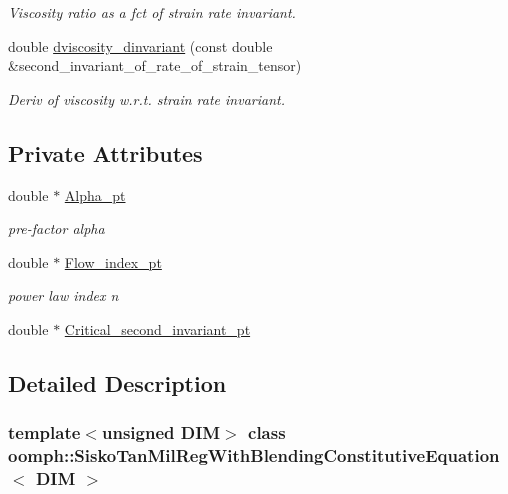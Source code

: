 \begin{DoxyCompactItemize}
\begin{DoxyCompactList}\small\item\em Viscosity ratio as a fct of strain rate invariant. \end{DoxyCompactList}\item 
double \hyperlink{classoomph_1_1SiskoTanMilRegWithBlendingConstitutiveEquation_a66579b2c9c19b7ca3168fe58202e8591}{dviscosity\+\_\+dinvariant} (const double \&second\+\_\+invariant\+\_\+of\+\_\+rate\+\_\+of\+\_\+strain\+\_\+tensor)
\begin{DoxyCompactList}\small\item\em Deriv of viscosity w.\+r.\+t. strain rate invariant. \end{DoxyCompactList}\end{DoxyCompactItemize}
\subsection*{Private Attributes}
\begin{DoxyCompactItemize}
\item 
double $\ast$ \hyperlink{classoomph_1_1SiskoTanMilRegWithBlendingConstitutiveEquation_a33df82ccf7720d8e9bee3be5e4cf4781}{Alpha\+\_\+pt}
\begin{DoxyCompactList}\small\item\em pre-\/factor alpha \end{DoxyCompactList}\item 
double $\ast$ \hyperlink{classoomph_1_1SiskoTanMilRegWithBlendingConstitutiveEquation_a14da5ea532c1e43195a1088ef82a7f22}{Flow\+\_\+index\+\_\+pt}
\begin{DoxyCompactList}\small\item\em power law index n \end{DoxyCompactList}\item 
double $\ast$ \hyperlink{classoomph_1_1SiskoTanMilRegWithBlendingConstitutiveEquation_a933d63f71e194671e7d922cb3c98d0d3}{Critical\+\_\+second\+\_\+invariant\+\_\+pt}
\end{DoxyCompactItemize}


\subsection{Detailed Description}
\subsubsection*{template$<$unsigned D\+IM$>$\newline
class oomph\+::\+Sisko\+Tan\+Mil\+Reg\+With\+Blending\+Constitutive\+Equation$<$ D\+I\+M $>$}

